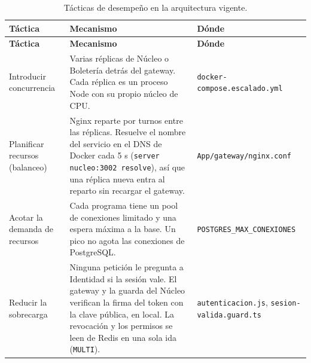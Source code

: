 \begin{center}
\begin{longtable}{|>{\raggedright\arraybackslash}p{2.8cm}|>{\raggedright\arraybackslash}p{6.7cm}|>{\raggedright\arraybackslash}p{3.8cm}|}
\caption{Tácticas de desempeño en la arquitectura vigente.}\label{tab:desempeno-vigente}\\
\hline
\textbf{Táctica} & \textbf{Mecanismo} & \textbf{Dónde}\\
\hline
\endfirsthead
\hline
\textbf{Táctica} & \textbf{Mecanismo} & \textbf{Dónde}\\
\hline
\endhead
Introducir concurrencia &
Varias réplicas de Núcleo o Boletería detrás del gateway. Cada réplica es un proceso Node con su
propio núcleo de CPU. &
\texttt{docker-compose.\allowbreak escalado.yml}\\
\hline
Planificar recursos (balanceo) &
Nginx reparte por turnos entre las réplicas. Resuelve el nombre del servicio en el DNS de Docker
cada 5 s (\texttt{server nucleo:3002 resolve}), así que una réplica nueva entra al reparto sin
recargar el gateway. &
\texttt{App/gateway/\allowbreak nginx.conf}\\
\hline
Acotar la demanda de recursos &
Cada programa tiene un pool de conexiones limitado y una espera máxima a la base. Un pico no agota
las conexiones de PostgreSQL. &
\texttt{POSTGRES\_MAX\_\allowbreak CONEXIONES}\\
\hline
Reducir la sobrecarga &
Ninguna petición le pregunta a Identidad si la sesión vale. El gateway y la guarda del Núcleo
verifican la firma del token con la clave pública, en local. La revocación y los permisos se leen
de Redis en una sola ida (\texttt{MULTI}). &
\texttt{autenticacion.js}, \texttt{sesion-valida.\allowbreak guard.ts}\\
\hline
\end{longtable}
\end{center}

